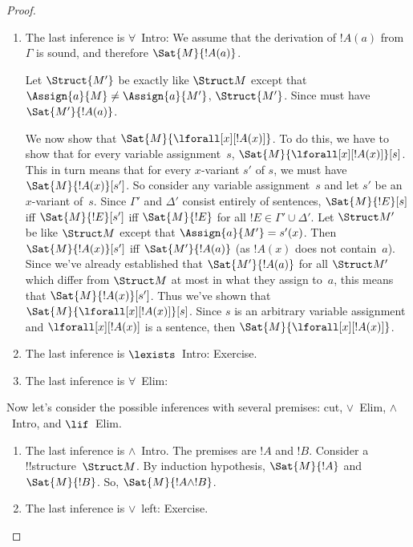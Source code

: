 \documentclass[../../include/open-logic-section]{subfiles}
\begin{document}
\begin{proof}
\begin{enumerate}
\item The last inference is $\forall$~Intro: We assume that the derivation of
$!A(a)$ from $\Gamma$ is sound, and therefore $\Sat{M}{!A(a)}$.

  Let $\Struct{M'}$ be exactly like $\Struct M$ except that
  $\Assign{a}{M} \neq \Assign{a}{M'}$, $\Struct{M'}$. Since
  must have $\Sat{M'}{!A(a)}$.

  We now show that $\Sat{M}{\lforall[x][!A(x)]}$.  To do this, we have
  to show that for every variable assignment~$s$,
  $\Sat{M}{\lforall[x][!A(x)]}[s]$.  This in turn means that for every
  $x$-variant $s'$ of $s$, we must have $\Sat{M}{!A(x)}[s']$.  So
  consider any variable assignment~$s$ and let $s'$ be an $x$-variant
  of~$s$.  Since $\Gamma'$ and $\Delta'$ consist entirely of sentences,
  $\Sat{M}{!E}[s]$ iff $\Sat{M}{!E}[s']$ iff $\Sat{M}{!E}$ for all
  $!E \in \Gamma' \cup \Delta'$.  Let $\Struct M'$ be like $\Struct M$
  except that $\Assign{a}{M'} = s'(x)$.  Then $\Sat{M}{!A(x)}[s']$ iff
  $\Sat{M'}{!A(a)}$ (as $!A(x)$ does not contain~$a$).  Since we've
  already established that $\Sat{M'}{!A(a)}$ for all $\Struct M'$
  which differ from $\Struct M$ at most in what they assign to~$a$,
  this means that $\Sat{M}{!A(x)}[s']$.  Thus we've shown that
  $\Sat{M}{\lforall[x][!A(x)]}[s]$.  Since $s$ is an arbitrary variable
  assignment and $\lforall[x][!A(x)]$ is a sentence, then
  $\Sat{M}{\lforall[x][!A(x)]}$.

  
\item The last inference is $\lexists$~Intro: Exercise.

\item The last inference is $\forall$~Elim: 


\end{enumerate}
Now let's consider the possible inferences with several premises: cut,
$\lor$~Elim, $\land$~Intro, and $\lif$~Elim.
\begin{enumerate}

\item The last inference is $\land$~Intro.  The premises are $!A$
  and $!B$. Consider a !!{structure}~$\Struct M$. By induction 
  hypothesis, $\Sat{M}{!A}$ and $\Sat{M}{!B}$. So, $\Sat{M}
  {!A \land !B}$.
  
\item The last inference is $\lor$~left: Exercise.


\end{enumerate}
\end{proof}
\end{document}
